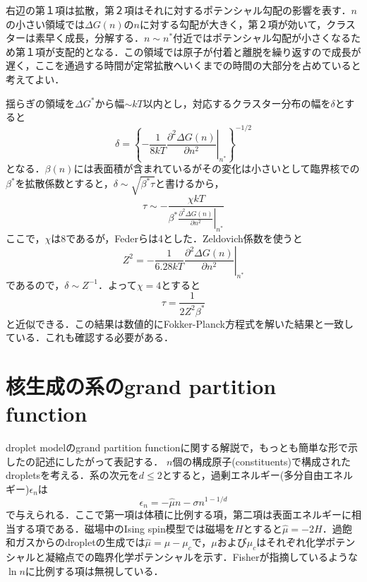 \documentclass[a4j,10pt]{jarticle}
\begin{document}
右辺の第１項は拡散，第２項はそれに対するポテンシャル勾配の影響を表す．$n$の小さい領域では$\Delta G(n)$の$n$に対する勾配が大きく，第２項が効いて，クラスターは素早く成長，分解する．$n \sim n^*$付近ではポテンシャル勾配が小さくなるため第１項が支配的となる．この領域では原子が付着と離脱を繰り返すので成長が遅く，ここを通過する時間が定常拡散へいくまでの時間の大部分を占めていると考えてよい．

揺らぎの領域を$\Delta G^*$から幅$\sim kT$以内とし，対応するクラスター分布の幅を$\delta$とすると
\begin{equation}
\delta =\left\{- \frac{1}{8kT} 
\left. \frac{\partial^2 \Delta G(n)}{\partial n^2} \right|_{n^*} 
\right\}^{-1/2}
\end{equation}
となる．$\beta(n)$には表面積が含まれているがその変化は小さいとして臨界核での$\beta^*$を拡散係数とすると，$\delta \sim \sqrt{\beta^* \tau}$と書けるから，
\begin{equation}
\tau \sim -\frac{\chi  k T}{\beta^* \left. \frac{\partial^2 \Delta G(n)}{\partial n^2} \right|_{n^*}  }
\end{equation}
ここで，$\chi$は8であるが，Federらは4とした．Zeldovich係数を使うと
\begin{equation}
Z^2 = - \frac{1}{6.28 kT} \left. \frac{\partial^2 \Delta G(n)}{\partial n^2} \right|_{n^*} 
\end{equation}
であるので，$\delta \sim Z^{-1}$．よって$\chi =4$とすると
\begin{equation}
\tau = \frac{1}{2 Z^2 \beta^*}
\end{equation}
と近似できる．この結果は数値的にFokker-Planck方程式を解いた結果と一致している．これも確認する必要がある．

\section{核生成の系のgrand partition function}
droplet modelのgrand partition functionに関する解説で，もっとも簡単な形で示した\cite{Kastrup:1998}の記述にしたがって表記する．
$n$個の構成原子(constituents)で構成されたdropletsを考える．系の次元を$d \leq 2$とすると，過剰エネルギー(多分自由エネルギー)$\epsilon_n$は
\begin{equation}
\epsilon_n = - \hat{\mu} n - \sigma n^{1-1/d} 
\end{equation}
で与えられる．ここで第一項は体積に比例する項，第二項は表面エネルギーに相当する項である．磁場中のIsing spin模型では磁場を$H$とすると$\hat{\mu} = -2H$．過飽和ガスからのdropletの生成では$\hat{\mu} = \mu -\mu_c$で，$\mu$および$\mu_c$はそれぞれ化学ポテンシャルと凝縮点での臨界化学ポテンシャルを示す．Fisherが指摘しているような$\ln n$に比例する項は無視している．
\end{document}
